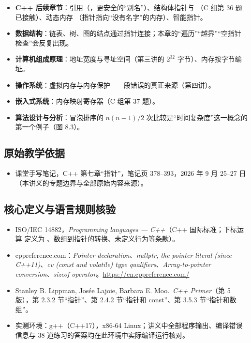 \begin{connectionbox}[本章知识以后在哪里还会出现]
\begin{itemize}
  \item \textbf{C++ 后续章节}：引用（，更安全的“别名”）、结构体指针与 \cc{->}（C 组第 36 题已接触）、动态内存 （指针指向“没有名字”的内存）、智能指针。
  \item \textbf{数据结构}：链表、树、图的结点通过指针连接；本章的“遍历”“越界”“空指针检查”会反复出现。
  \item \textbf{计算机组成原理}：地址宽度与寻址空间（第三讲的 $2^{32}$ 字节）、内存按字节编址。
  \item \textbf{操作系统}：虚拟内存与内存保护——段错误的真正来源（第四讲）。
  \item \textbf{嵌入式系统}：内存映射寄存器（C 组第 37 题）。
  \item \textbf{算法设计与分析}：冒泡排序的 $n(n-1)/2$ 次比较是“时间复杂度”这一概念的第一个例子（图 8.3）。
\end{itemize}
\end{connectionbox}

\subsection*{原始教学依据}
\begin{itemize}
  \item 课堂手写笔记，C++ 第七章“指针”，笔记页 378--393，2026 年 9 月 25--27 日（本讲义的专题边界与全部原始内容来源）。
\end{itemize}
\subsection*{核心定义与语言规则核验}
\begin{itemize}
  \item ISO/IEC 14882，\emph{Programming languages --- C++}（C++ 国际标准；下标运算  定义为 、数组到指针的转换、未定义行为等条款）。
  \item cppreference.com：\emph{Pointer declaration}、\emph{nullptr, the pointer literal (since C++11)}、\emph{cv (const and volatile) type qualifiers}、\emph{Array-to-pointer conversion}、\emph{sizeof operator}。\url{https://en.cppreference.com/}
  \item Stanley B. Lippman, Josée Lajoie, Barbara E. Moo.\ \emph{C++ Primer}（第 5 版），第 2.3.2 节“指针”、第 2.4.2 节“指针和 const”、第 3.5.3 节“指针和数组”。
  \item 实测环境：g++（C++17），x86-64 Linux；讲义中全部程序输出、编译错误信息与 38 道练习的答案均在此环境中实际编译运行核对。
\end{itemize}
